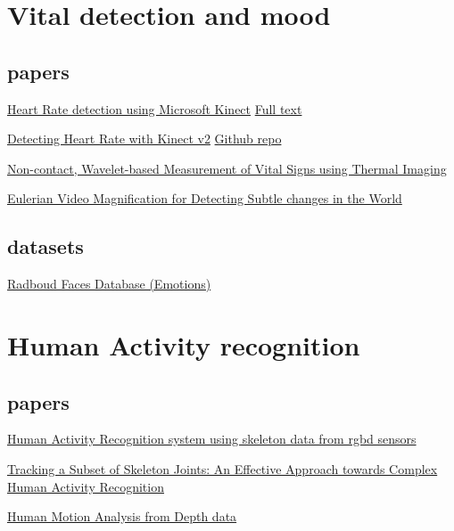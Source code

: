 \section{Vital detection and mood}
\subsection{papers}

\href{https://www.ncbi.nlm.nih.gov/pmc/articles/PMC5579477/table/sensors-17-01776-t002/}{Heart Rate detection using Microsoft Kinect}
\href{https://www.ncbi.nlm.nih.gov/pmc/articles/PMC5579477/}{Full text}

\href{https://blogs.msdn.microsoft.com/kinectforwindows/2015/06/12/detecting-heart-rate-with-kinect/}{Detecting Heart Rate with Kinect v2}
\href{https://github.com/dngoins/Kinectv2HeartRate}{Github repo}

\href{http://www.cvip.louisville.edu/wwwcvip/research/publications/Pub_Pdf/2005_2/GVIP_2005.pdf}{Non-contact, Wavelet-based Measurement of Vital Signs using Thermal Imaging }

\href{https://people.csail.mit.edu/mrub/papers/vidmag.pdf}{Eulerian Video Magnification for Detecting Subtle changes in the World}

\subsection{datasets}
\href{http://www.socsci.ru.nl:8180/RaFD2/RaFD?p=main}{Radboud Faces Database (Emotions)}



\section{Human Activity recognition}
\subsection{papers}

\href{https://www.hindawi.com/journals/cin/2016/4351435/}{Human Activity Recognition system using skeleton data from rgbd sensors}

\href{https://www.hindawi.com/journals/jr/2017/7610417/}{Tracking a Subset of Skeleton Joints: An Effective Approach towards Complex Human Activity Recognition}

\href{http://files.is.tue.mpg.de/jgall/tutorials/slides/motionanalysis_DRAFT.pdf}{Human Motion Analysis from Depth data}


